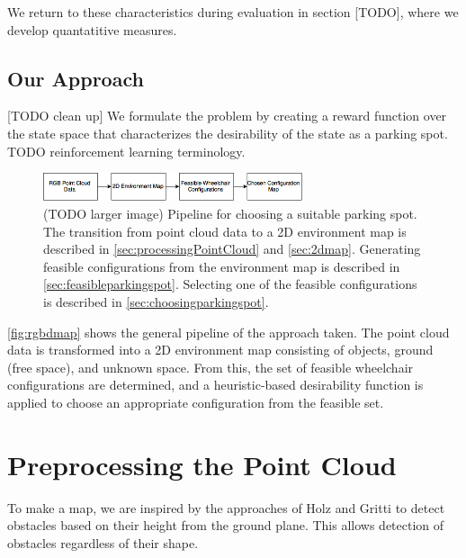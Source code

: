 We return to these characteristics during evaluation in section [TODO], where we
develop quantatitive measures.



\subsection{Our Approach}

[TODO clean up]
We formulate the problem by creating a reward function over the state space
that characterizes the desirability of the state as a parking spot.
TODO reinforcement learning terminology.


\begin{figure}
\centering
\includegraphics[width=3in]{figures/rgbdmap.png}
\caption{(TODO larger image) Pipeline for choosing a suitable parking spot.
The transition from point cloud data to a 2D environment map is described in
\autoref{sec:processingPointCloud} and \autoref{sec:2dmap}. Generating feasible configurations from the
environment map is described in \autoref{sec:feasibleparkingspot}. Selecting one
of the feasible configurations is described in
\autoref{sec:choosingparkingspot}.}
\label{fig:rgbdmap}
\end{figure}

\autoref{fig:rgbdmap} shows the general pipeline of the approach taken. The
point cloud data is transformed into a 2D environment map consisting of objects,
ground (free space), and unknown space. From this, the set of feasible
wheelchair configurations are determined, and a heuristic-based desirability
function is applied to choose an appropriate configuration from the feasible set.





\section{Preprocessing the Point Cloud}
\label{sec:processingPointCloud}
To make a map, we are inspired by the approaches of Holz \cite{holz2013towards}
and Gritti \cite{gritti2014kinect} to detect obstacles based on their height
from the ground plane. This allows detection of obstacles regardless of
their shape.

